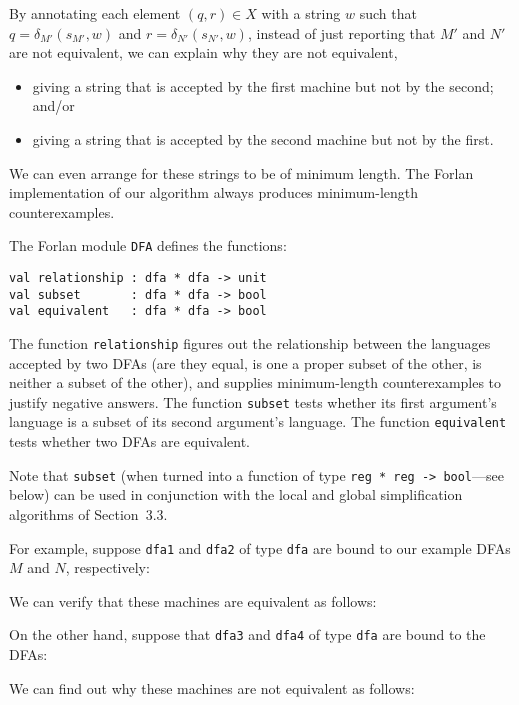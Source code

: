 By annotating each element $(q,r)\in X$ with a string $w$ such that
$q=\delta_{M'}(s_{M'},w)$ and $r=\delta_{N'}(s_{N'},w)$, instead of
just reporting that $M'$ and $N'$ are not equivalent, we can
explain why they are not equivalent,
\begin{itemize}
\item giving a string that is accepted by the first machine but not by
  the second; and/or

\item giving a string that is accepted by the second machine but not
  by the first.
\end{itemize}
We can even arrange for these strings to be of minimum length.
The Forlan implementation of our algorithm always produces minimum-length
counterexamples.

The Forlan module \texttt{DFA} defines the functions:
\begin{verbatim}
val relationship : dfa * dfa -> unit
val subset       : dfa * dfa -> bool
val equivalent   : dfa * dfa -> bool
\end{verbatim}
%
%
%
The function \texttt{relationship} figures out the relationship
between the languages accepted by two DFAs (are they equal, is one a
proper subset of the other, is neither a subset of the other), and
supplies minimum-length counterexamples to justify negative answers.
The function \texttt{subset} tests whether its first argument's
language is a subset of its second argument's language.
The function \texttt{equivalent} tests whether two DFAs are
equivalent.

Note that \texttt{subset} (when turned into a function of type
\texttt{reg~*~reg~->~bool}---see below) can be used in conjunction
with the local and global simplification algorithms of Section~3.3.

For example, suppose \texttt{dfa1} and \texttt{dfa2} of type \texttt{dfa} are
bound to our example DFAs $M$ and $N$, respectively:
\begin{center}

\end{center}
We can verify that these machines are equivalent as follows:


On the other hand, suppose that \texttt{dfa3} and \texttt{dfa4} of type
\texttt{dfa} are bound to the DFAs:
\begin{center}

\end{center}
We can find out why these machines are not equivalent as follows:



